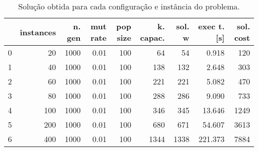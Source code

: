 \documentclass{article}
\begin{document}
\begin{table}
\centering
\begin{tabular}{lrrrrrrrr}
\toprule
{} &  instances &  n. gen &  mut rate &  pop size &  k. capac. &  sol. w &  exec t. [s] &  sol. cost \\
\midrule
0 &         20 &    1000 &      0.01 &       100 &         64 &      54 &        0.918 &        120 \\
1 &         40 &    1000 &      0.01 &       100 &        138 &     132 &        2.648 &        303 \\
2 &         60 &    1000 &      0.01 &       100 &        221 &     221 &        5.082 &        470 \\
3 &         80 &    1000 &      0.01 &       100 &        288 &     286 &        9.090 &        733 \\
4 &        100 &    1000 &      0.01 &       100 &        346 &     345 &       13.646 &       1249 \\
5 &        200 &    1000 &      0.01 &       100 &        680 &     671 &       54.607 &       3613 \\
6 &        400 &    1000 &      0.01 &       100 &       1344 &    1338 &      221.373 &       7884 \\
\bottomrule
\end{tabular}
\caption{Solução obtida para cada configuração e instância do problema.}
\label{table:all-data}
\end{table}
\end{document}
